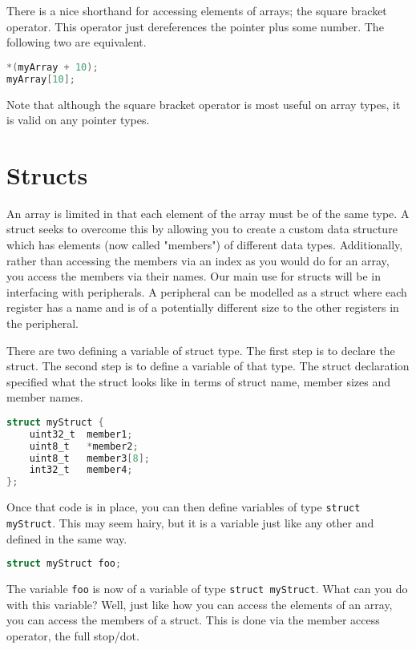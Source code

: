 There is a nice shorthand for accessing elements of arrays; the square bracket operator. This operator just dereferences the pointer plus some number. The following two are equivalent. 
\begin{lstlisting}[language=C]
*(myArray + 10);
myArray[10];
\end{lstlisting}

Note that although the square bracket operator is most useful on array types, it is valid on any pointer types. 

\section{Structs}
An array is limited in that each element of the array must be of the same type. A struct seeks to overcome this by allowing you to create a custom data structure which has elements (now called "members") of different data types. Additionally, rather than accessing the members via an index as you would do for an array, you access the members via their names. 
Our main use for structs will be in interfacing with peripherals.
A peripheral can be modelled as a struct where each register has a name and is of a potentially different size to the other registers in the peripheral.

There are two defining a variable of struct type.
The first step is to declare the struct. The second step is to define a variable of that type.
The struct declaration specified what the struct looks like in terms of struct name, member sizes and member names.

\begin{lstlisting}[language=C]
struct myStruct {
    uint32_t  member1;
    uint8_t   *member2;
    uint8_t   member3[8];
    int32_t   member4; 
};
\end{lstlisting}

Once that code is in place, you can then define variables of type \texttt{struct myStruct}. This may seem hairy, but it is a variable just like any other and defined in the same way.

\begin{lstlisting}[language=C]
struct myStruct foo;
\end{lstlisting}

The variable \texttt{foo} is now of a variable of type \texttt{struct myStruct}. What can you do with this variable? Well, just like how you can access the elements of an array, you can access the members of a struct. This is done via the member access operator, the full stop/dot. 

